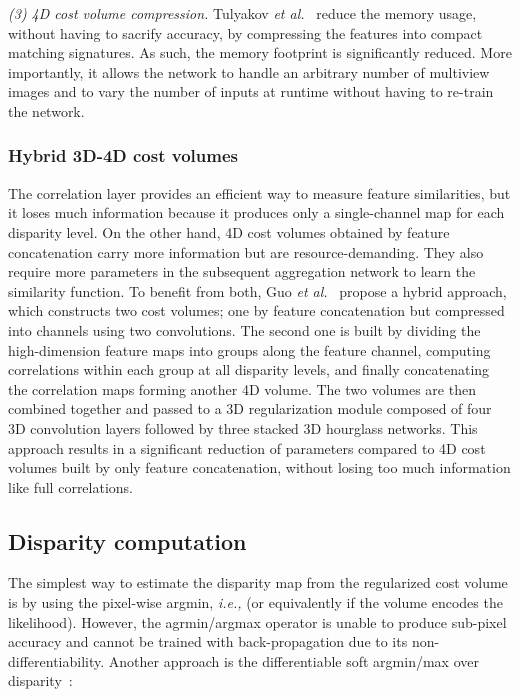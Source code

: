 \documentclass[10pt,journal,compsoc]{IEEEtran}
\newcommand{\ie}{\emph{i.e., }}
\newcommand{\etal}{\emph{et al.}}
\newcommand{\noi}{\noindent}
\begin{document}
\vspace{6pt}
\noi\textit{(3) 4D cost volume compression. } Tulyakov \etal~\cite{tulyakov2018practical} reduce the memory usage, without  having to sacrify accuracy,  by compressing the  features into compact matching signatures. As such, the memory footprint is significantly reduced. More importantly, it allows the network to handle an arbitrary number of multiview images and to vary the number of inputs at runtime without having to re-train the network. 



\subsubsection{Hybrid 3D-4D cost volumes} 
\label{sec:hybrid_cost_volume}
The correlation layer provides an efficient way to measure feature similarities, but it loses much information because it produces only a single-channel  map for each disparity level.  On the other hand,  4D cost volumes obtained by feature  concatenation carry more information but are resource-demanding. They also  require more parameters in the subsequent aggregation network to learn the similarity  function.  To benefit from both, Guo \etal~\cite{guo2019group} propose a hybrid approach, which constructs two  cost volumes; one by  feature concatenation but compressed into  channels using two convolutions. The second one is built by  dividing the high-dimension feature maps into   groups along the feature channel,  computing correlations within each group at all disparity levels, and finally concatenating the correlation maps forming another 4D volume.  The two volumes are then combined together and passed to a 3D regularization module composed of four 3D convolution layers followed by  three stacked 3D hourglass networks.  This approach results  in a significant reduction of parameters compared to 4D cost volumes built by only feature concatenation, without losing too much information like full correlations. 




\subsection{Disparity computation}
\label{sec:final_depth_estimation}

The simplest way to estimate  the disparity map  from the regularized cost volume   is by using the pixel-wise  argmin, \ie   (or equivalently  if the volume  encodes the likelihood). However, the agrmin/argmax operator is unable to produce sub-pixel accuracy and cannot be trained with back-propagation due to its non-differentiability.  Another approach is  the differentiable soft argmin/max over disparity~\cite{flynn2016deepstereo,kendall2017end,zhang2018activestereonet,khamis2018stereonet}:
\end{document}
